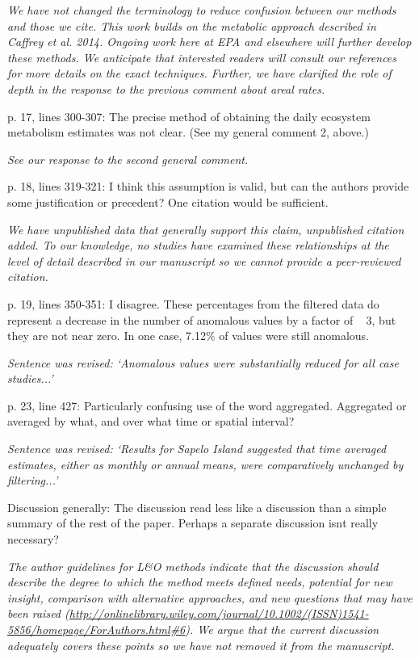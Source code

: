 \documentclass[letterpaper,12pt]{article}\usepackage[]{graphicx}\usepackage[]{color}
\begin{document}
{\it We have not changed the terminology to reduce confusion between our methods and those we cite.  This work builds on the metabolic approach described in Caffrey et al. 2014.  Ongoing work here at EPA and elsewhere will further develop these methods.  We anticipate that interested readers will consult our references for more details on the exact techniques.  Further, we have clarified the role of depth in the response to the previous comment about areal rates.}

p. 17, lines 300-307: The precise method of obtaining the daily ecosystem metabolism estimates was not clear. (See my general comment 2, above.)

{\it See our response to the second general comment.}

p. 18, lines 319-321: I think this assumption is valid, but can the authors provide some justification or precedent? One citation would be sufficient.

{\it We have unpublished data that generally support this claim, unpublished citation added.  To our knowledge, no studies have examined these relationships at the level of detail described in our manuscript so we cannot provide a peer-reviewed citation.}

p. 19, lines 350-351: I disagree. These percentages from the filtered data do represent a decrease
in the number of anomalous values by a factor of ~ 3, but they are not near zero. In one case,
7.12\% of values were still anomalous.

{\it Sentence was revised: `Anomalous values were substantially reduced for all case studies...'}

p. 23, line 427: Particularly confusing use of the word aggregated. Aggregated or averaged by
what, and over what time or spatial interval?

{\it Sentence was revised: `Results for Sapelo Island suggested that time averaged estimates, either as monthly or annual means, were comparatively unchanged by filtering...'}

Discussion generally: The discussion read less like a discussion than a simple summary of the rest of the paper. Perhaps a separate discussion isnt really necessary?

{\it The author guidelines for L\&O methods indicate that the discussion should describe the degree to which the method meets defined needs, potential for new insight, comparison with alternative approaches, and new questions that may have been raised (\href{http://onlinelibrary.wiley.com/journal/10.1002/(ISSN)1541-5856/homepage/ForAuthors.html#6}{http://onlinelibrary.wiley.com/journal/10.1002/(ISSN)1541-5856/homepage/ForAuthors.html\#6}).  We argue that the current discussion adequately covers these points so we have not removed it from the manuscript. 
}
\end{document}
